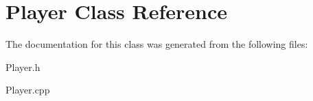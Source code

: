 \hypertarget{class_player}{}\section{Player Class Reference}
\label{class_player}


The documentation for this class was generated from the following files\+:\begin{DoxyCompactItemize}
\item 
Player.\+h\item 
Player.\+cpp\end{DoxyCompactItemize}
